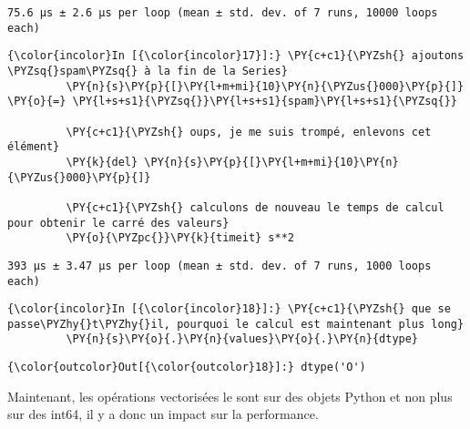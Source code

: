     \begin{Verbatim}[commandchars=\\\{\},frame=single,framerule=0.3mm,rulecolor=\color{cellframecolor}]
75.6 µs ± 2.6 µs per loop (mean ± std. dev. of 7 runs, 10000 loops each)
\end{Verbatim}

    \begin{Verbatim}[commandchars=\\\{\},frame=single,framerule=0.3mm,rulecolor=\color{cellframecolor}]
{\color{incolor}In [{\color{incolor}17}]:} \PY{c+c1}{\PYZsh{} ajoutons \PYZsq{}spam\PYZsq{} à la fin de la Series}
         \PY{n}{s}\PY{p}{[}\PY{l+m+mi}{10}\PY{n}{\PYZus{}000}\PY{p}{]} \PY{o}{=} \PY{l+s+s1}{\PYZsq{}}\PY{l+s+s1}{spam}\PY{l+s+s1}{\PYZsq{}}
         
         \PY{c+c1}{\PYZsh{} oups, je me suis trompé, enlevons cet élément}
         \PY{k}{del} \PY{n}{s}\PY{p}{[}\PY{l+m+mi}{10}\PY{n}{\PYZus{}000}\PY{p}{]}
         
         \PY{c+c1}{\PYZsh{} calculons de nouveau le temps de calcul pour obtenir le carré des valeurs}
         \PY{o}{\PYZpc{}}\PY{k}{timeit} s**2
\end{Verbatim}


    \begin{Verbatim}[commandchars=\\\{\},frame=single,framerule=0.3mm,rulecolor=\color{cellframecolor}]
393 µs ± 3.47 µs per loop (mean ± std. dev. of 7 runs, 1000 loops each)
\end{Verbatim}

    \begin{Verbatim}[commandchars=\\\{\},frame=single,framerule=0.3mm,rulecolor=\color{cellframecolor}]
{\color{incolor}In [{\color{incolor}18}]:} \PY{c+c1}{\PYZsh{} que se passe\PYZhy{}t\PYZhy{}il, pourquoi le calcul est maintenant plus long}
         \PY{n}{s}\PY{o}{.}\PY{n}{values}\PY{o}{.}\PY{n}{dtype}
\end{Verbatim}


\begin{Verbatim}[commandchars=\\\{\},frame=single,framerule=0.3mm,rulecolor=\color{cellframecolor}]
{\color{outcolor}Out[{\color{outcolor}18}]:} dtype('O')
\end{Verbatim}
            
    Maintenant, les opérations vectorisées le sont sur des objets Python et
non plus sur des int64, il y a donc un impact sur la performance.

